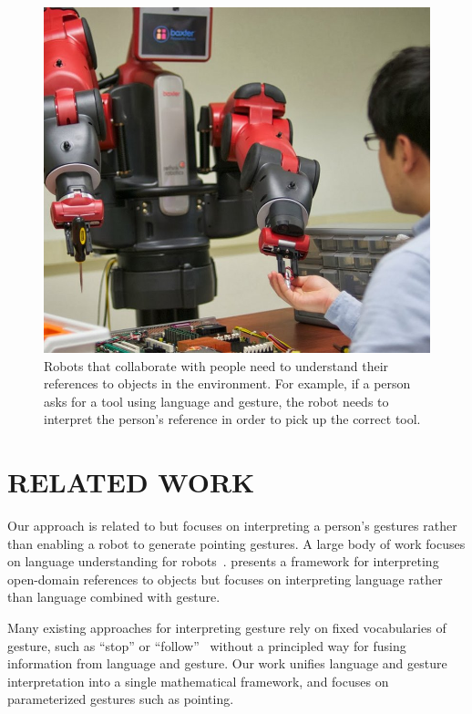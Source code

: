 \documentclass[letterpaper, 10 pt, conference]{ieeeconf}
\begin{document}
\begin{figure}
\centering
\includegraphics[width=1\linewidth]{figures/baxter_scene_cropped.jpg}
\caption{Robots that collaborate with people need to understand their
  references to objects in the environment.  For example, if a person
  asks for a tool using language and gesture, the robot needs to
  interpret the person's reference in order to pick up the correct
  tool.\label{fig:example}}
\end{figure}

\section{RELATED WORK}

Our approach is related to \citet{holladay14} but focuses on
interpreting a person's gestures rather than enabling a robot to
generate pointing gestures.  A large body of work focuses on language
understanding for robots~\citep{macmahon06, dzifcak09, kollar10,
  matuszek12}.  \citet{guadarrama14} presents a framework for
interpreting open-domain references to objects but focuses on
interpreting language rather than language combined with gesture.

Many existing approaches for interpreting gesture rely on fixed
vocabularies of gesture, such as ``stop'' or
``follow''~\citep{waldherr00, marge11} without a principled way for
fusing information from language and gesture.  Our work unifies
language and gesture interpretation into a single mathematical
framework, and focuses on parameterized gestures such as pointing.
\end{document}
